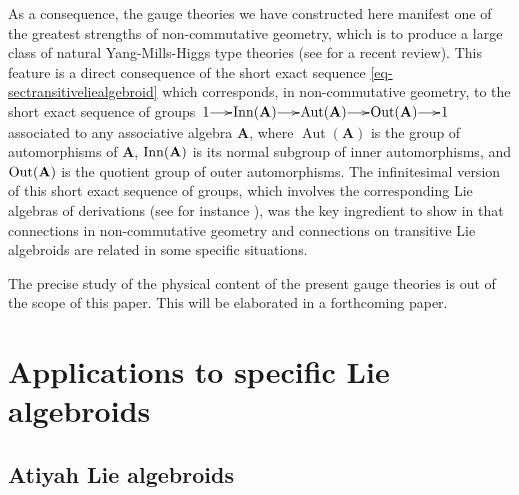 \documentclass[number]{elsarticle}
\theoremstyle{definition}
\theoremstyle{remark}
\numberwithin{equation}{section}
\begin{document}
As a consequence, the gauge theories we have constructed here manifest one of the greatest strengths of non-commutative geometry, which is to produce a large class of natural Yang-Mills-Higgs type theories (see \cite{Mass42} for a recent review). This feature is a direct consequence of the short exact sequence \eqref{eq-sectransitiveliealgebroid} which corresponds, in non-commutative geometry, to the short exact sequence of groups $\xymatrix@1@C=15pt{{1} \ar[r] & {{{\text{\textup{Inn}}}}({{{{\mathbf{{A}}}}}})} \ar[r] & {\operatorname{Aut}({{{{\mathbf{{A}}}}}})} \ar[r] & {{{\text{\textup{Out}}}}({{{{\mathbf{{A}}}}}})} \ar[r] & {1}}$ associated to any associative algebra ${{{{\mathbf{{A}}}}}}$, where $\operatorname{Aut}({{{{\mathbf{{A}}}}}})$ is the group of automorphisms of ${{{{\mathbf{{A}}}}}}$, ${{\text{\textup{Inn}}}}({{{{\mathbf{{A}}}}}})$ is its normal subgroup of inner automorphisms, and ${{\text{\textup{Out}}}}({{{{\mathbf{{A}}}}}})$ is the quotient group of outer automorphisms. The infinitesimal version of this short exact sequence of groups, which involves the corresponding Lie algebras of derivations (see for instance \cite[eq. (4.10)]{Mass38}), was the key ingredient to show in \cite{Mass38} that connections in non-commutative geometry and connections on transitive Lie algebroids are related in some specific situations.

The precise study of the physical content of the present gauge theories is out of the scope of this paper. This will be elaborated in a forthcoming paper.

\section{Applications to specific Lie algebroids}
\label{sec-applicationAtiyah}

\subsection{Atiyah Lie algebroids}
\label{subsec-applicationAtiyah}
\end{document}
